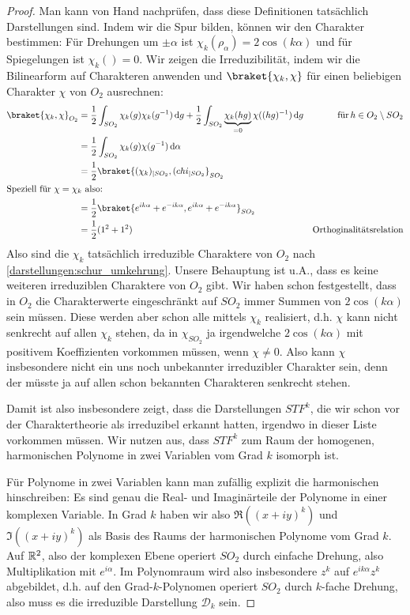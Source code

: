 \begin{proof}
Man kann von Hand nachprüfen, dass diese Definitionen tatsächlich Darstellungen sind. Indem wir die Spur bilden, können wir den Charakter bestimmen: Für Drehungen um $\pm\alpha$ ist $\chi_k(\rho_\alpha) = 2\cos(k\alpha)$ und für Spiegelungen ist $\chi_k()=0$. Wir zeigen die Irreduzibilität, indem wir die Bilinearform auf Charakteren anwenden und $\braket{\chi_k,\chi}$ für einen beliebigen Charakter $\chi$ von $O_2$ ausrechnen:
\begin{align*}
\braket{\chi_k,\chi}_{O_2} &= \frac{1}{2}\int_{SO_2} \chi_k(g)\chi_k(g^{-1}) \dd g + \frac{1}{2}\int_{SO_2} \underbrace{\chi_k(hg)}_{=0}\chi((hg)^{-1})\dd g &\text{für}\,h\in O_2\setminus SO_2\\
&= \frac{1}{2}\int_{SO_2} \chi_k(g)\chi(g^{-1}) \dd \alpha \\
&= \frac{1}{2} \braket{ (\chi_k)_{|SO_2} , (chi_{|SO_2}}_{SO_2} \\
\intertext{Speziell für $\chi=\chi_k$ also:}
&= \frac{1}{2} \braket{e^{ik\alpha} + e^{-ik\alpha}, e^{ik\alpha} + e^{-ik\alpha}}_{SO_2} \\
&=\frac{1}{2}(1^2 + 1^2) &\text{Orthoginalitätsrelation}
\end{align*}
Also sind die $\chi_k$ tatsächlich irreduzible Charaktere von $O_2$ nach \ref{darstellungen:schur_umkehrung}. Unsere Behauptung ist u.A., dass es keine weiteren irreduziblen Charaktere von $O_2$ gibt. Wir haben schon festgestellt, dass in $O_2$ die Charakterwerte eingeschränkt auf $SO_2$ immer Summen von $2\cos(k\alpha)$ sein müssen. Diese werden aber schon alle mittels $\chi_k$ realisiert, d.h. $\chi$ kann nicht senkrecht auf allen $\chi_k$ stehen, da in $\chi_{SO_2}$ ja irgendwelche $2\cos(k\alpha)$ mit positivem Koeffizienten vorkommen müssen, wenn $\chi\neq 0$. Also kann $\chi$ insbesondere nicht ein uns noch unbekannter irreduzibler Charakter sein, denn der müsste ja auf allen schon bekannten Charakteren senkrecht stehen.

\medbreak
Damit ist also insbesondere zeigt, dass die Darstellungen $STF^k$, die wir schon vor der Charaktertheorie als irreduzibel erkannt hatten, irgendwo in dieser Liste vorkommen müssen. Wir nutzen aus, dass $STF^k$ zum Raum der homogenen, harmonischen Polynome in zwei Variablen vom Grad $k$ isomorph ist.

Für Polynome in zwei Variablen kann man zufällig explizit die harmonischen hinschreiben: Es sind genau die Real- und Imaginärteile der Polynome in einer komplexen Variable. In Grad $k$ haben wir also $\Re((x+iy)^k)$ und $\Im((x+iy)^k)$ als Basis des Raums der harmonischen Polynome vom Grad $k$. Auf $\mathbb{R}^2$, also der komplexen Ebene operiert $SO_2$ durch einfache Drehung, also Multiplikation mit $e^{i\alpha}$. Im Polynomraum wird also insbesondere $z^k$ auf $e^{ik\alpha}z^k$ abgebildet, d.h. auf den Grad-$k$-Polynomen operiert $SO_2$ durch $k$-fache Drehung, also muss es die irreduzible Darstellung $\mathcal{D}_k$ sein.
\end{proof}